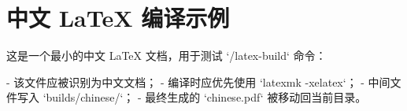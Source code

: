 \documentclass[12pt]{article}
\begin{document}
\section*{中文 LaTeX 编译示例}

这是一个最小的中文 LaTeX 文档，用于测试 `/latex-build` 命令：

- 该文件应被识别为中文文档；
- 编译时应优先使用 `latexmk -xelatex`；
- 中间文件写入 `builds/chinese/`；
- 最终生成的 `chinese.pdf` 被移动回当前目录。
\end{document}

